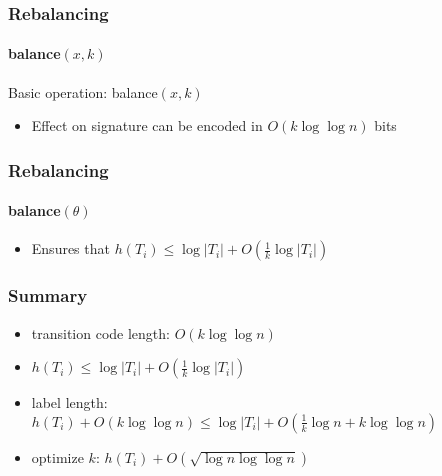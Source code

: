 \documentclass[aspectratio=169,xcolor=dvipsnames]{beamer}
\begin{document}
\begin{frame}
    \frametitle{Rebalancing}
    \framesubtitle{balance$(x,k)$}

    Basic operation: balance$(x,k)$
    \begin{center}
    \end{center}
    \begin{itemize}
        \item<5->Effect on signature can be encoded in $O(k\log\log n)$ bits
    \end{itemize}
\end{frame}

\begin{frame}
    \frametitle{Rebalancing}
    \framesubtitle{balance$(\theta)$}

    \begin{center}
    \end{center}
    \begin{itemize}
        \item<11->Ensures that $h(T_i)\le \log|T_i| + O(\tfrac{1}{k}\log|T_i|)$
    \end{itemize}
\end{frame}

\begin{frame}
    \frametitle{Summary}
    \begin{itemize}[<+->]
        \item transition code length: $O(k\log\log n)$
        \item $h(T_i) \le \log|T_i| + O(\tfrac{1}{k}\log|T_i|)$
        \item label length: $h(T_i) + O(k\log\log n)\le \log|T_i| + O(\tfrac{1}{k}\log n + k\log\log n)$
        \item optimize $k$: $h(T_i) + O(\sqrt{\log n\log\log n})$
    \end{itemize}
\end{frame}
\end{document}
